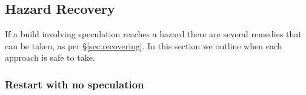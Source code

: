 \begin{comment}

\subsection{Additional commands have no effect}
\label{sec:proof:additional}

Given a script with no hazards when executed sequentially, we can show that speculating unnecessary commands will not affect the build's output. %

Proof by induction.

Let us assume we have a build $A$ which has no hazards when executed sequentially.

Base case:  Build $A$ has 1 command $c$.  Let us assume we have a command $d$ that does not write to any file read or written by $c$.  By this definition of $d$, it is obvious that $d$ running before or
concurrently with $c$ as part of build $A$, will not affect the files written by $c$ and therefore will not affect the output of $A$.

Inductive case: Let us assume the above claim is true for a build with $n$ commands.  Let us show the claim is true for a build of $n+1$ commands.

Let $A$ have $n+1$ command.  From the inductive hypothesis we know the output of the first $n$ commands is unchanged.  And, we know that $c$ does not write to any file read or written by command $n+1$.  And, because the build has no hazards, all files read by $n+1$ were written to before $n+1$ ran, so the output files of $n+1$ remain unchanged as well.  Therefore, the output of $A$ remained unaffected by $c$.
\end{comment}

\subsection{Hazard Recovery}
\label{sec:proof:classify_hazard}

If a build involving speculation reaches a hazard there are several remedies that can be taken, as per \S\ref{sec:recovering}. In this section we outline when each approach is safe to take.

\subsubsection{Restart with no speculation}
\label{sec:proof:restart_no_speculation}

